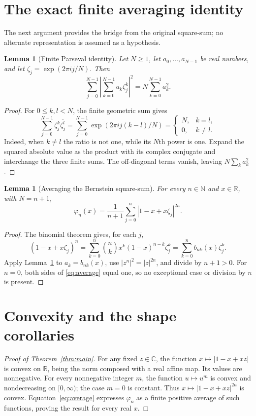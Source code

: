 \documentclass[11pt]{article}
\newtheorem{lemma}[theorem]{Lemma}
\newcommand{\R}{\mathbb R}
\newcommand{\C}{\mathbb C}
\newcommand{\N}{\mathbb N}
\newcommand{\ph}{\varphi}
\begin{document}
\section{The exact finite averaging identity}
The next argument provides the bridge from the original square-sum;
no alternate representation is assumed as a hypothesis.

\begin{lemma}[Finite Parseval identity]\label{lem:parseval}
Let $N\geq1$, let $a_0,\ldots,a_{N-1}$ be real numbers, and let
$\zeta_j=\exp(2\pi i j/N)$. Then
\[
 \sum_{j=0}^{N-1}\left|\sum_{k=0}^{N-1}a_k\zeta_j^k\right|^2
 =N\sum_{k=0}^{N-1}a_k^2.
\]
\end{lemma}
\begin{proof}
For $0\leq k,l<N$, the finite geometric sum gives
\[
 \sum_{j=0}^{N-1}\zeta_j^k\overline{\zeta_j^l}
 =\sum_{j=0}^{N-1}\exp(2\pi i j(k-l)/N)
 =\begin{cases}N,&k=l,\\0,&k\ne l.\end{cases}
\]
Indeed, when $k\ne l$ the ratio is not one, while its $N$th power is
one. Expand the squared absolute value as the product with its complex
conjugate and interchange the three finite sums. The off-diagonal terms
vanish, leaving $N\sum_k a_k^2$.
\end{proof}

\begin{lemma}[Averaging the Bernstein square-sum]\label{lem:average}
For every $n\in\N$ and $x\in\R$, with $N=n+1$,
\begin{equation}\label{eq:average}
 \ph_n(x)=\frac1{n+1}\sum_{j=0}^{n}
       |1-x+x\zeta_j|^{2n}.
\end{equation}
\end{lemma}
\begin{proof}
The binomial theorem gives, for each $j$,
\[
 (1-x+x\zeta_j)^n
 =\sum_{k=0}^n\binom nk x^k(1-x)^{n-k}\zeta_j^k
 =\sum_{k=0}^n b_{nk}(x)\zeta_j^k.
\]
Apply Lemma~\ref{lem:parseval} to $a_k=b_{nk}(x)$, use
$|z^n|^2=|z|^{2n}$, and divide by $n+1>0$.
For $n=0$, both sides of \eqref{eq:average} equal one, so no exceptional
case or division by $n$ is present.
\end{proof}

\section{Convexity and the shape corollaries}
\begin{proof}[Proof of Theorem~\ref{thm:main}]
For any fixed $z\in\C$, the function $x\mapsto |1-x+xz|$ is convex
on $\R$, being the norm composed with a real affine map. Its values
are nonnegative. For every nonnegative integer $m$, the function
$u\mapsto u^m$ is convex and nondecreasing on $[0,\infty)$; the case
$m=0$ is constant. Thus $x\mapsto |1-x+xz|^{2n}$ is convex.
Equation~\eqref{eq:average} expresses $\ph_n$ as a finite positive
average of such functions, proving the result for every real $x$.
\end{proof}
\end{document}
